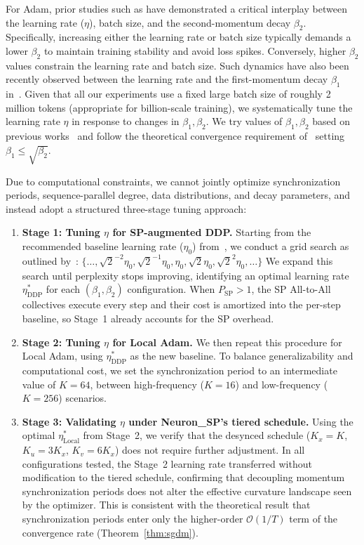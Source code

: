 \documentclass{article}
\begin{document}
For Adam, prior studies such as \citet{wortsman2023stable} have demonstrated a critical interplay between the learning rate ($\eta$), batch size, and the second-momentum decay $\beta_2$. Specifically, increasing either the learning rate or batch size typically demands a lower $\beta_2$ to maintain training stability and avoid loss spikes. Conversely, higher $\beta_2$ values constrain the learning rate and batch size. Such dynamics have also been recently observed between the learning rate and the first-momentum decay $\beta_1$ in~\citet{pagliardini2025ademamix}. Given that all our experiments use a fixed large batch size of roughly 2 million tokens (appropriate for billion-scale training), we systematically tune the learning rate $\eta$ in response to changes in $\beta_1, \beta_2$. We try values of $\beta_1, \beta_2$ based on previous works~\citep{zhang2025critical} and follow the theoretical convergence requirement of~\citet{zhang2022adam} setting $\beta_1 \leq \sqrt{\beta_2}$.

Due to computational constraints, we cannot jointly optimize synchronization periods, sequence-parallel degree, data distributions, and decay parameters, and instead adopt a structured three-stage tuning approach:
\begin{enumerate}
    \item \textbf{Stage 1: Tuning $\eta$ for SP-augmented DDP.} Starting from the recommended baseline learning rate ($\eta_0$)
    from~\citet{allal2025smollm2}, we conduct a grid search as outlined by~\citet{charles2025communication}:
    $\{\ldots, \sqrt{2}^{-2}\eta_0, \sqrt{2}^{-1}\eta_0, \eta_0, \sqrt{2}\eta_0, \sqrt{2}^2\eta_0, \ldots\}$
    We expand this search until perplexity stops improving, identifying an optimal learning rate $\eta^*_{\text{DDP}}$ for each $(\beta_1, \beta_2)$ configuration.
    When $P_{\text{SP}} > 1$, the SP All-to-All collectives execute every step and their cost is amortized into the per-step baseline, so Stage~1 already accounts for the SP overhead.

    \item \textbf{Stage 2: Tuning $\eta$ for Local Adam.} We then repeat this procedure for Local Adam,
    using $\eta^*_{\text{DDP}}$ as the new baseline. To balance generalizability and computational cost, we set
    the synchronization period to an intermediate value of $K = 64$, between high-frequency ($K = 16$) and low-frequency ($K = 256$) scenarios.

    \item \textbf{Stage 3: Validating $\eta$ under Neuron\_SP's tiered schedule.}
    Using the optimal $\eta^*_{\text{Local}}$ from Stage~2, we verify that the desynced
    schedule ($K_x = K$, $K_u = 3K_x$, $K_v = 6K_x$) does not require further adjustment.
    In all configurations tested, the Stage~2 learning rate transferred without modification
    to the tiered schedule, confirming that decoupling momentum synchronization periods does
    not alter the effective curvature landscape seen by the optimizer.
    This is consistent with the theoretical result that synchronization periods enter only
    the higher-order $\mathcal{O}(1/T)$ term of the convergence rate
    (Theorem~\ref{thm:sgdm}).
\end{enumerate}
\end{document}
